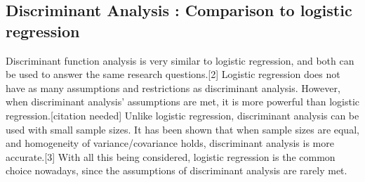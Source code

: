 \subsection{Discriminant Analysis : Comparison to logistic regression}

Discriminant function analysis is very similar to logistic regression, and both can be used to answer the same research questions.[2] Logistic regression does not have as many assumptions and restrictions as discriminant analysis. However, when discriminant analysis’ assumptions are met, it is more powerful than logistic regression.[citation needed] Unlike logistic regression, discriminant analysis can be used with small sample sizes. It has been shown that when sample sizes are equal, and homogeneity of variance/covariance holds, discriminant analysis is more accurate.[3] With all this being considered, logistic regression is 
the common choice nowadays, since the assumptions of discriminant analysis are rarely met.


